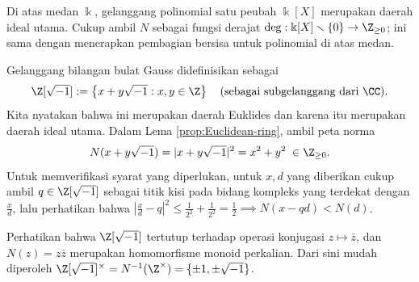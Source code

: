 \begin{example}\label{eg:polynomial-PID}
	Di atas medan $\Bbbk$, gelanggang polinomial satu peubah $\Bbbk[X]$ merupakan daerah ideal utama. Cukup ambil $N$ sebagai fungsi derajat $\deg: \Bbbk[X] \smallsetminus \{0\} \to \Z_{\geq 0}$; ini sama dengan menerapkan pembagian bersisa untuk polinomial di atas medan.
\end{example}

\begin{example}\label{eg:Gauss-integers}
	Gelanggang bilangan bulat Gauss didefinisikan sebagai
	\[ \Z[\sqrt{-1}] := \left\{ x+y\sqrt{-1} : x,y \in \Z \right\} \quad \text{(sebagai subgelanggang dari $\CC$)}. \]
	Kita nyatakan bahwa ini merupakan daerah Euklides dan karena itu merupakan daerah ideal utama. Dalam Lema \ref{prop:Euclidean-ring}, ambil peta norma
	\[ N(x+y\sqrt{-1}) = |x+y\sqrt{-1}|^2 = x^2 + y^2 \;\in \Z_{\geq 0}. \]
	Untuk memverifikasi syarat yang diperlukan, untuk $x, d$ yang diberikan cukup ambil $q \in \Z[\sqrt{-1}]$ sebagai titik kisi pada bidang kompleks yang terdekat dengan $\frac{x}{d}$, lalu perhatikan bahwa $\left| \frac{x}{d} - q \right|^2 \leq \frac{1}{2^2} + \frac{1}{2^2} = \frac{1}{2} \implies N(x-qd) < N(d)$.
	
	Perhatikan bahwa $\Z[\sqrt{-1}]$ tertutup terhadap operasi konjugasi $z \mapsto \bar{z}$, dan $N(z)=z\bar{z}$ merupakan homomorfisme monoid perkalian. Dari sini mudah diperoleh $\Z[\sqrt{-1}]^\times = N^{-1}(\Z^\times) = \{\pm 1, \pm\sqrt{-1}\}$.
\end{example}

